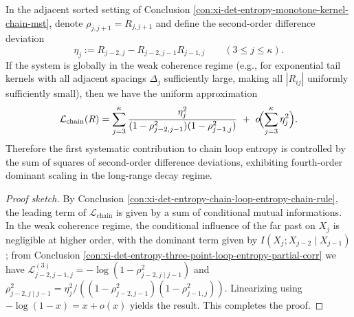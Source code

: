 \begin{conclusion}[\texorpdfstring{$q=4$}{q=4} volume law for weak coherence chains: loop entropy dominant term is sum of squared second-order difference deviations]\label{con:xi-det-entropy-weak-coherence-chain-q4-law}
In the adjacent sorted setting of Conclusion \ref{con:xi-det-entropy-monotone-kernel-chain-mst}, denote \(\rho_{j,j+1}=R_{j,j+1}\) and define the second-order difference deviation
\[
\eta_j:=R_{j-2,j}-R_{j-2,j-1}R_{j-1,j}\qquad(3\le j\le\kappa).
\]
If the system is globally in the weak coherence regime (e.g., for exponential tail kernels with all adjacent spacings \(\Delta_j\) sufficiently large, making all \(|R_{ij}|\) uniformly sufficiently small), then we have the uniform approximation
\[
\mathcal L_{\mathrm{chain}}(R)
=\sum_{j=3}^{\kappa}\frac{\eta_j^2}{(1-\rho_{j-2,j-1}^2)(1-\rho_{j-1,j}^2)}
\ +\ o\!\Bigl(\sum_{j=3}^{\kappa}\eta_j^2\Bigr).
\]
Therefore the first systematic contribution to chain loop entropy is controlled by the sum of squares of second-order difference deviations, exhibiting fourth-order dominant scaling in the long-range decay regime.
\end{conclusion}
\begin{proof}[Proof sketch]
By Conclusion \ref{con:xi-det-entropy-chain-loop-entropy-chain-rule}, the leading term of \(\mathcal L_{\mathrm{chain}}\) is given by a sum of conditional mutual informations.
In the weak coherence regime, the conditional influence of the far past on \(X_j\) is negligible at higher order, with the dominant term given by \(I(X_j;X_{j-2}\mid X_{j-1})\);
from Conclusion \ref{con:xi-det-entropy-three-point-loop-entropy-partial-corr} we have
\(
\mathcal L^{(3)}_{j-2,j-1,j}=-\log(1-\rho_{j-2,j\mid j-1}^2)
\)
and
\(
\rho_{j-2,j\mid j-1}^2=\eta_j^2/((1-\rho_{j-2,j-1}^2)(1-\rho_{j-1,j}^2))
\).
Linearizing using \(-\log(1-x)=x+o(x)\) yields the result. This completes the proof.
\end{proof}

